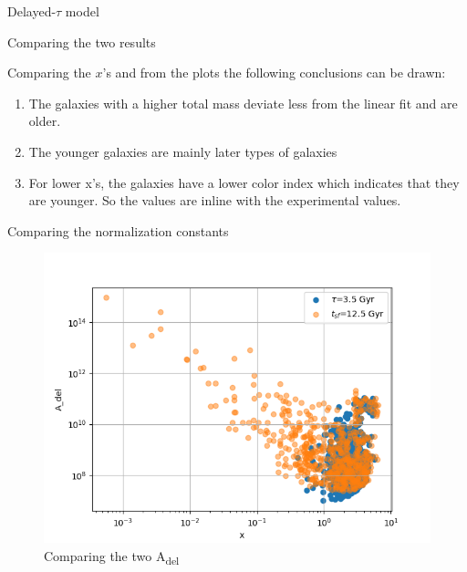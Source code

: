 \documentclass[presentation]{beamer}
\begin{document}
\begin{frame}[label={sec:org05089e9}]{Delayed-\(\tau\) model}
\begin{block}{Comparing the two results}
\begin{block}{Comparing the \(x\)'s}
and from the plots the following conclusions can be drawn:

\begin{enumerate}
\item The galaxies with a higher total mass deviate less from the linear fit and are older.
\item The younger galaxies are mainly later types of galaxies
\item For lower x's, the galaxies have a lower color index which indicates that they are younger. So the values are inline with the experimental values.
\end{enumerate}
\end{block}

\begin{block}{Comparing the normalization constants}
\begin{figure}[!htpb]
\centering
\includegraphics[width=.9\linewidth]{./figs/Comparing_the_A_x.png}
\caption{\label{fig:Comparing the two A_{del}}Comparing the two A\textsubscript{del}}
\end{figure}




\end{block}
\end{block}
\end{frame}
\end{document}
